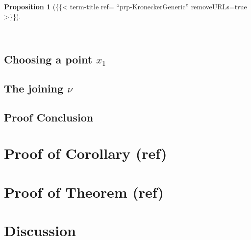 \documentclass[
  british,
]{article}
\theoremstyle{definition}
\theoremstyle{plain}
\newtheorem{proposition}{Proposition}[section]
\theoremstyle{plain}
\theoremstyle{remark}
\begin{document}
\begin{proposition}[\{\{\textless{} term-title ref=
``prp-KroneckerGeneric'' removeURLs=true
\textgreater\}\}]\protect\hypertarget{prp-KroneckerGeneric}{}\label{prp-KroneckerGeneric}

~

\end{proposition}

\subsection{\texorpdfstring{Choosing a point
\(x_1\)}{Choosing a point x\_1}}\label{choosing-a-point-x_1}

\subsection{\texorpdfstring{The joining
\(\nu\)}{The joining \textbackslash nu}}\label{the-joining-nu}

\subsection{Proof Conclusion}\label{proof-conclusion}

\section{Proof of Corollary (ref)}\label{proof-of-corollary-ref}

\section{Proof of Theorem (ref)}\label{proof-of-theorem-ref}

\section*{Discussion}\label{discussion}
\end{document}

